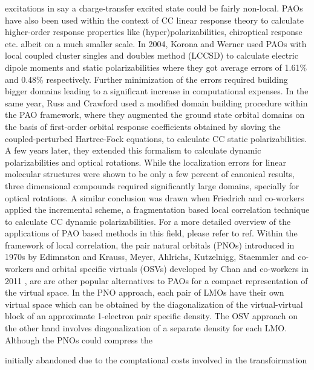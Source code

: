 excitations in say a charge-transfer excited state could be fairly non-local. PAOs have also been 
used within the context of CC linear response theory to calculate higher-order response 
properties like (hyper)polarizabilities, chiroptical response etc. albeit on a 
much smaller scale.\cite{} In 2004, Korona and Werner\cite{} used PAOs with local 
coupled cluster singles and doubles method (LCCSD) to calculate electric dipole moments and 
static polarizabilities where they got average errors of 1.61\% and 0.48\% respectively.
Further minimization of the errors required building bigger domains leading to a 
significant increase in computational expenses. In the same year, Russ and Crawford\cite{}
used a modified domain building procedure within the PAO framework, where they augmented 
the ground state orbital domains on the basis of first-order orbital response coefficients 
obtained by sloving the coupled-perturbed Hartree-Fock equations, to calculate CC static polarizabilities. 
A few years later, they extended this formalism to calculate dynamic polarizabilities and optical rotations\cite{}. 
While the localization errors for linear molecular structures were shown to be only a few percent of canonical
results, three dimensional compounds required significantly large domains, specially for 
optical rotations. A similar conclusion was drawn when Friedrich and co-workers
applied the incremental scheme, a fragmentation based local correlation 
technique to calculate CC dynamic polarizabilities.\cite{} 
For a more detailed overview of the applications of PAO based methods in this field, 
please refer to ref\cite{McAlexander15}. Within the framework of local correlation,
the pair natural orbitals (PNOs) introduced in 1970s by Edimnston and Krauss\cite{}, 
Meyer\cite{}, Ahlrichs\cite{}, Kutzelnigg\cite{}, Staemmler and co-workers\cite{} 
and orbital specific virtuals (OSVs) developed by Chan and co-workers in 2011 \cite{}, are 
are other popular alternatives to PAOs for a compact representation of the
virtual space. In the PNO approach, each pair of LMOs have their own virtual space 
which can be obtained by the diagonalization of the virtual-virtual 
block of an approximate 1-electron pair specific density. The OSV approach
on the other hand involves diagonalization of a separate density for each LMO.
Although the PNOs could compress the 


 

initially abandoned due to the comptational costs involved in the transfoirmation 


